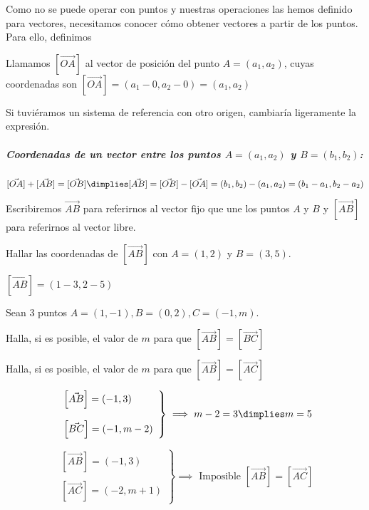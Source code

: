 Como no se puede operar con puntos y nuestras operaciones las hemos definido para vectores, necesitamos conocer cómo obtener vectores a partir de los puntos. Para ello, definimos

\begin{defn} Llamamos $[\vec{OA}]$ al vector de posición del punto $A=(a_1,a_2)$, cuyas coordenadas son $[\vec{OA}] = (a_1-0,a_2-0)=(a_1,a_2)$

\obs Si tuviéramos un sistema de referencia con otro origen, cambiaría ligeramente la expresión.
\end{defn}


\subparagraph{Coordenadas de un vector entre los puntos $A=(a_1,a_2)$ y $B=(b_1,b_2)$:} 

$[\vec{OA}] + [\vec{AB}] =  [\vec{OB}] \dimplies [\vec{AB}] =  [\vec{OB}] - [\vec{OA}] = (b_1,b_2) - (a_1,a_2) = (b_1-a_1,b_2-a_2)$


\obs Escribiremos $\vec{AB}$ para referirnos al vector fijo que une los puntos $A$ y $B$ y $[\vec{AB}]$  para referirnos al vector libre.

\begin{example}
Hallar las coordenadas de $[\vec{AB}]$ con $A=(1,2)$ y $B=(3,5)$.

$[\vec{AB}] = (1-3,2-5)$
\end{example}

\begin{problem}
Sean 3 puntos $A=(1,-1), B=(0,2), C=(-1,m)$.

\ppart Halla, si es posible, el valor de $m$ para que $[\vec{AB}] = [\vec{BC}]$

\ppart Halla, si es posible, el valor de $m$ para que $[\vec{AB}] = [\vec{AC}]$

\solution

\spart 
\[
\left.\begin{array}{l}
	\left[\vec{AB}\right] = (-1,3)\\\\
	\left[\vec{BC}\right] = (-1,m-2)
\end{array}\right\} \implies m-2=3 \dimplies m=5
\]

\spart 
\[
\left.\begin{array}{l}
	\left[\vec{AB}\right] = (-1,3)\\\\
	\left[\vec{AC}\right] = (-2,m+1)
\end{array}\right\} \implies \text{ Imposible } [\vec{AB}] = [\vec{AC}]
\]

\end{problem}

